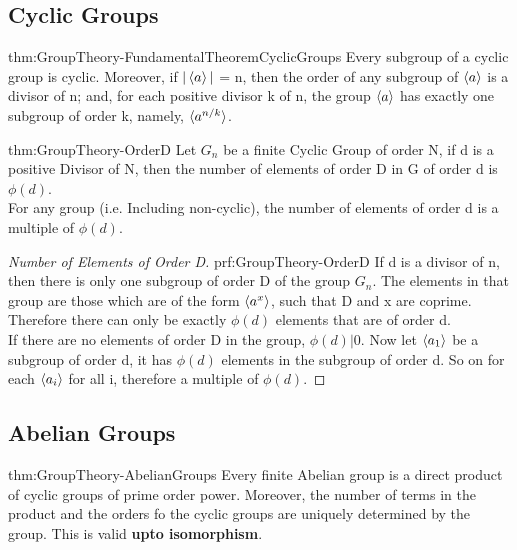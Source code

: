 \subsection{Cyclic Groups}

\begin{theorem}{thm:GroupTheory-FundamentalTheoremCyclicGroups}
    Every subgroup of a cyclic group is cyclic.
    Moreover, if $|\braket{a}|$ = n, then the order of any subgroup of $\braket{a}$ is a divisor of n; and, for each positive divisor k of n, the group $\braket{a}$ has exactly one subgroup of order k, namely, $\braket{a^{n/k}}$.
\end{theorem}

\begin{theorem}{thm:GroupTheory-OrderD}
    Let $G_n$ be a finite Cyclic Group of order N, if d is a positive Divisor of N, then the number of elements of order D in G of order d is $\phi(d)$. \vspace{5pt} \\ For any group (i.e. Including non-cyclic), the number of elements of order d is a multiple of $\phi(d)$.
\end{theorem}

\begin{proof}[Number of Elements of Order D]{prf:GroupTheory-OrderD}
    If d is a divisor of n, then there is only one subgroup of order D of the group $G_n$. The elements in that group are those which are of the form $ \braket{a^x} $, such that D and x are coprime. Therefore there can only be exactly $\phi(d)$ elements that are of order d.
    \vspace{5px} \\ If there are no elements of order D in the group, $\phi(d) | 0$. Now let $\braket{a_1}$ be a subgroup of order d, it has $\phi(d)$ elements in the subgroup of order d. So on for each $\braket{a_i}$ for all i, therefore a multiple of $\phi(d)$.
\end{proof}


\subsection{Abelian Groups}

\begin{theorem}{thm:GroupTheory-AbelianGroups}
    Every finite Abelian group is a direct product of cyclic groups of prime order power.
    Moreover, the number of terms in the product and the orders fo the cyclic groups are 
    uniquely determined by the group. This is valid \textbf{upto isomorphism}.
\end{theorem}

